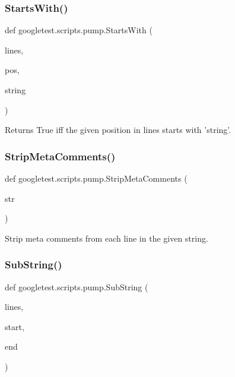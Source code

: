 \mbox{\label{namespacegoogletest_1_1scripts_1_1pump_a8179e17bde05923198fb01d990bd0361}} 
\subsubsection{\texorpdfstring{StartsWith()}{StartsWith()}}
{\footnotesize\ttfamily def googletest.\+scripts.\+pump.\+Starts\+With (\begin{DoxyParamCaption}\item[{}]{lines,  }\item[{}]{pos,  }\item[{}]{string }\end{DoxyParamCaption})}

\begin{DoxyVerb}Returns True iff the given position in lines starts with 'string'.\end{DoxyVerb}
 \mbox{\label{namespacegoogletest_1_1scripts_1_1pump_a61b93d0aeb7eacf9e6df72d6094eaaa8}} 
\subsubsection{\texorpdfstring{StripMetaComments()}{StripMetaComments()}}
{\footnotesize\ttfamily def googletest.\+scripts.\+pump.\+Strip\+Meta\+Comments (\begin{DoxyParamCaption}\item[{}]{str }\end{DoxyParamCaption})}

\begin{DoxyVerb}Strip meta comments from each line in the given string.\end{DoxyVerb}
 \mbox{\label{namespacegoogletest_1_1scripts_1_1pump_ad5f087df98d72b3d0263fd8cd16f9c92}} 
\subsubsection{\texorpdfstring{SubString()}{SubString()}}
{\footnotesize\ttfamily def googletest.\+scripts.\+pump.\+Sub\+String (\begin{DoxyParamCaption}\item[{}]{lines,  }\item[{}]{start,  }\item[{}]{end }\end{DoxyParamCaption})}


